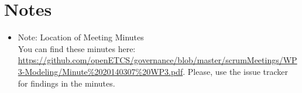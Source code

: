 \documentclass[a4paper, 11pt]{article}
\begin{document}
\section{Notes}
\begin{itemize}

\item Note: Location of Meeting Minutes\\
You can find these minutes here: \url{https://github.com/openETCS/governance/blob/master/scrumMeetings/WP3-Modeling/Minute%2020140307%20WP3.pdf}. Please, use the issue tracker for findings in the minutes.
\end{itemize}
\end{document}

